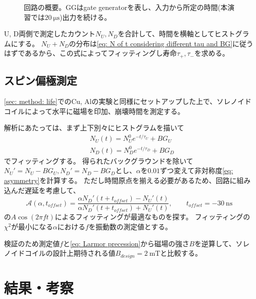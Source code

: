 \documentclass[dvipdfmx]{jsarticle}
\begin{document}
\begin{figure}
    \centering
    
    \caption{回路の概要。GGはgate generatorを表し、入力から所定の時間(本演習では$\SI[]{20}[]{\micro\second}$)出力を続ける。}
    \label{fig: circuit easy}
\end{figure}

U, D両側で測定したカウント$N_U, N_D$を合計して、時間を横軸としてヒストグラムにする。
$N_U+N_D$の分布は\eqref{eq: N of t considering different tau and BG}に従うはずであるから、この式によってフィッティングし寿命$\tau_+, \tau_-$を求める。


\subsection{スピン偏極測定}

\ref{sec: method: life}でのCu, Alの実験と同様にセットアップした上で、ソレノイドコイルによって水平に磁場を印加、崩壊時間を測定する。

解析にあたっては、まず上下別々にヒストグラムを描いて
\begin{equation}
    \label{eq: method: rough fitting of spin polarization by exp}
    \begin{split}
        &N_U(t)=N_U^0e^{-t/\tau_U}+BG_U
        \\
        &N_D(t)=N_D^0e^{-t/\tau_D}+BG_D
    \end{split}
\end{equation}
でフィッティングする。
得られたバックグラウンドを除いて$N_U'=N_U-BG_U, N_D'=N_D-BG_D$とし、$\alpha$を$0.01$ずつ変えて非対称度\eqref{eq: asymmetry}を計算する。
ただし時間原点を揃える必要があるため、回路に組み込んだ遅延を考慮して、
\begin{equation}
    \label{eq: method: fit asymmetry}
    \mathscr{A}(\alpha,t_{offset})
    =
    \frac{\alpha N_D'(t+t_{offset})-N_U'(t)}{\alpha N_D'(t+t_{offset})+N_U'(t)}
    ,
    \qquad
    t_{offset}=-\SI{30}{\nano\second}
\end{equation}
の$A\cos(2\pi ft)$によるフィッティングが最適なものを探す。
フィッティングの$\chi^2$が最小になる$\alpha$における$f$を振動数の測定値とする。

検証のため測定値$f$と\eqref{eq: Larmor precession}から磁場の強さ$B$を逆算して、ソレノイドコイルの設計上期待される値$B_{design}=\SI{2}{\milli\tesla}$と比較する。


\section{結果・考察}
\end{document}
